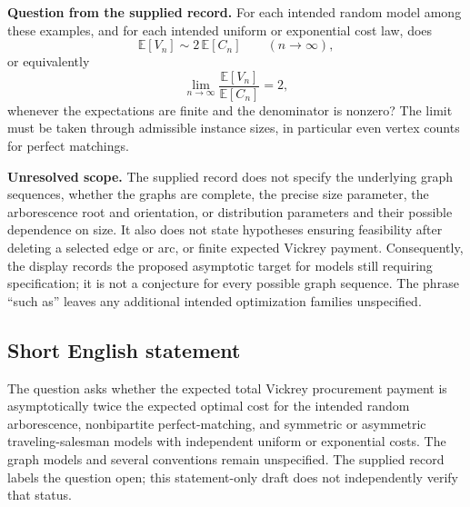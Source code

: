 \documentclass[11pt]{article}
\begin{document}
\textbf{Question from the supplied record.} For each intended random model among these examples, and for each intended uniform or exponential cost law, does
\[
 \mathbb E[V_n]\sim 2\,\mathbb E[C_n]
 \qquad (n\to\infty),
\]
or equivalently
\[
 \lim_{n\to\infty}
 \frac{\mathbb E[V_n]}{\mathbb E[C_n]}=2,
\]
whenever the expectations are finite and the denominator is nonzero? The limit must be taken through admissible instance sizes, in particular even vertex counts for perfect matchings.

\textbf{Unresolved scope.} The supplied record does not specify the underlying graph sequences, whether the graphs are complete, the precise size parameter, the arborescence root and orientation, or distribution parameters and their possible dependence on size. It also does not state hypotheses ensuring feasibility after deleting a selected edge or arc, or finite expected Vickrey payment. Consequently, the display records the proposed asymptotic target for models still requiring specification; it is not a conjecture for every possible graph sequence. The phrase ``such as'' leaves any additional intended optimization families unspecified.
\subsection{Short English statement}
The question asks whether the expected total Vickrey procurement payment is asymptotically twice the expected optimal cost for the intended random arborescence, nonbipartite perfect-matching, and symmetric or asymmetric traveling-salesman models with independent uniform or exponential costs. The graph models and several conventions remain unspecified. The supplied record labels the question open; this statement-only draft does not independently verify that status.
\end{document}
